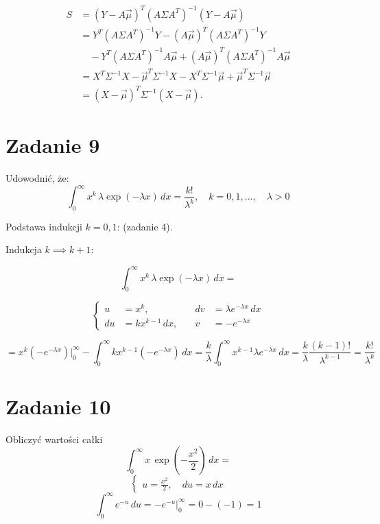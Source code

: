 \documentclass[11pt]{article}
\begin{document}
\begin{align*}
S &= (Y-A\vec{\mu})^T (A\Sigma A^T)^{-1} (Y-A\vec{\mu}) \\
  &= Y^T (A\Sigma A^T)^{-1} Y 
     - (A \vec{\mu})^T (A\Sigma A^T)^{-1} Y  \\
  &\quad - Y^T (A\Sigma A^T)^{-1} A \vec{\mu} 
     + (A \vec{\mu})^T (A\Sigma A^T)^{-1} A \vec{\mu} \\
  &= X^T \Sigma^{-1} X 
     - \vec{\mu}^T \Sigma^{-1} X 
     - X^T \Sigma^{-1} \vec{\mu} 
     + \vec{\mu}^T \Sigma^{-1} \vec{\mu} \\
  &= (X-\vec{\mu})^T \Sigma^{-1} (X-\vec{\mu}).
\end{align*}

\section*{Zadanie 9}
Udowodnić, że:
\[\int_{0}^{\infty}x^k \,\lambda \exp(-\lambda x)\,dx = \frac{k!}{\lambda^k}, \quad k = 0, 1, \ldots, \quad \lambda > 0\]


Podstawa indukcji $k = 0, 1$: (zadanie 4).

Indukcja $k \implies k + 1$:

\[\int_{0}^{\infty}x^k \,\lambda \exp(-\lambda x)\,dx = \]

\[\left\{
\begin{aligned}
u &= x^k, \quad &dv& = \lambda e^{-\lambda x}\,dx\\
du &= kx^{k-1}\,dx, \quad &v& = -e^{-\lambda x}
\end{aligned}
\right.
\]

\[
= x^k (-e^{-\lambda x}) \Big|_{0}^{\infty} - \int_{0}^{\infty} kx^{k-1} (-e^{-\lambda x})\, dx = \frac{k}{\lambda} \int_{0}^{\infty} x^{k-1} \lambda e^{-\lambda x}\,dx = \frac{k}{\lambda} \frac{(k-1)!}{\lambda^{k-1}} = \frac{k!}{\lambda^k} 
\]

\section*{Zadanie 10}
Obliczyć wartości całki
\[ \int_{0}^{\infty} x\,\exp(-\frac{x^2}{2})\,dx = \]
\[\left\{
\begin{aligned}
u = \frac{x^2}{2}, \quad du = x\,dx
\end{aligned}
\right.\]
\[ \int_{0}^{\infty} e^{-u}\,du = -e^{-u} \Big|_{0}^{\infty} = 0 - (-1) = 1\]
\end{document}
